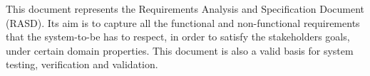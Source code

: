 This document represents the Requirements Analysis and Specification Document (RASD).
Its aim is to capture all the functional and non-functional requirements that the system-to-be has to respect, in order to satisfy the stakeholders goals, under certain domain properties. This document is also a valid basis for system testing, verification and validation.